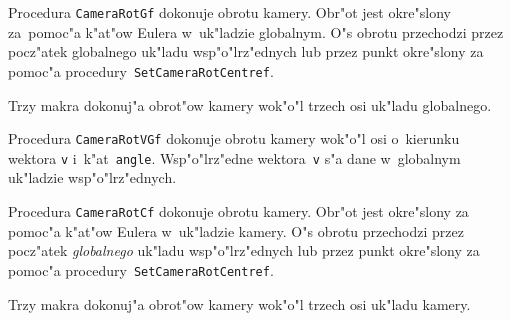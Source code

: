 \vspace{\bigskipamount}
Procedura \texttt{CameraRotGf} dokonuje obrotu kamery. Obr"ot jest
okre"slony za~pomoc"a k"at"ow Eulera w~uk"ladzie globalnym.
O"s obrotu przechodzi przez pocz"atek globalnego uk"ladu wsp"o"lrz"ednych
lub przez punkt okre"slony za pomoc"a procedury~\texttt{SetCameraRotCentref}.

\vspace{\bigskipamount}
Trzy makra dokonuj"a obrot"ow kamery wok"o"l trzech osi uk"ladu
globalnego.

\vspace{\bigskipamount}
Procedura \texttt{CameraRotVGf} dokonuje obrotu kamery wok"o"l osi
o~kierunku wektora \texttt{v} i~k"at~\texttt{angle}. Wsp"o"lrz"edne
wektora~\texttt{v} s"a dane w~globalnym uk"ladzie wsp"o"lrz"ednych.

\vspace{\bigskipamount}
Procedura \texttt{CameraRotCf} dokonuje obrotu kamery. Obr"ot jest
okre"slony za pomoc"a k"at"ow Eulera w~uk"ladzie kamery. O"s obrotu
przechodzi przez pocz"atek \emph{globalnego} uk"ladu wsp"o"lrz"ednych lub
przez punkt okre"slony za pomoc"a procedury~\texttt{SetCameraRotCentref}.

\vspace{\bigskipamount}
Trzy makra dokonuj"a obrot"ow kamery wok"o"l trzech osi uk"ladu kamery.

